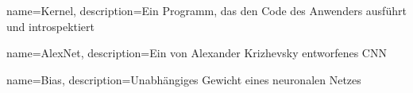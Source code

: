 
%
%

%
%

	{name={Kernel}, 
	description={Ein Programm, das den Code des Anwenders ausführt und introspektiert}
	}
	
	{name={AlexNet}, 
	description={Ein von Alexander Krizhevsky entworfenes \ac{CNN}}
	}

	{name={Bias}, 
	description={Unabhängiges Gewicht eines neuronalen Netzes}
	}

